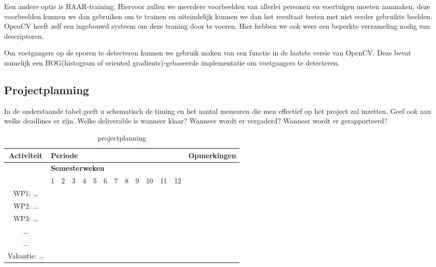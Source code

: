 \documentclass[]{book}
\begin{document}
Een andere optie is HAAR-training. Hiervoor zullen we meerdere voorbeelden van allerlei personen en voertuigen moeten aanmaken, deze voorbeelden kunnen we dan gebruiken om te trainen en uiteindelijk kunnen we dan het resultaat testen met niet eerder gebruikte beelden. OpenCV heeft zelf een ingebouwd systeem om deze traning door te voeren. Hier hebben we ook weer een beperkte verzameling nodig van descriptoren.

Om voetgangers op de sporen te detecteren kunnen we gebruik maken van een functie in de laatste versie van OpenCV. Deze bevat namelijk een HOG(histogram of oriented gradients)-gebaseerde implementatie om voetgangers te detecteren.

\subsection{Projectplanning}\label{sec:Projectplanning}

In de onderstaande tabel geeft u schematisch de timing en het aantal mensuren die men effectief op het project zal inzetten. Geef ook aan welke deadlines er zijn. Welke deliverable is wanneer klaar? Wanneer wordt er vergaderd? Wanneer wordt er gerapporteerd?

\begin{table}[h]
	\centering
		\begin{tabular}{|*{14}{c|}}
		\hline
		\textbf{Activiteit} & \multicolumn{12}{l|}{\textbf{Periode}} & \textbf{Opmerkingen} \\
		\hline
							 & \multicolumn{12}{l|}{\textbf{Semesterweken}} &   \\
		\hline 
		  & 1	& 2	& 3	& 4	& 5	& 6	& 7	& 8	& 9	& 10 & 11	& 12 & \\
		\hline 
		WP1: \ldots & & & & & & & & & & & & & \\
		\hline 
		WP2: \ldots & & & & & & & & & & & & & \\
		\hline 
		WP3: \ldots & & & & & & & & & & & & & \\
		\hline 
		 \ldots & & & & & & & & & & & & & \\
		\hline 
		 \ldots & & & & & & & & & & & & & \\
		\hline 
		Vakantie: \ldots & & & & & & & & & & & & & \\
		\hline
		\end{tabular}
	\caption{projectplanning}
	\label{tab:projectplanning}
\end{table}
																							

\end{document}

